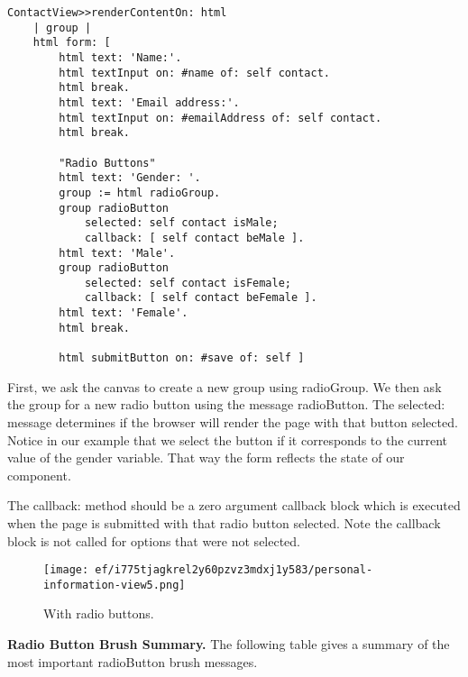 \documentclass[a4paper,10pt,twoside]{book}
\newcommand{\ct}[1]{{\small\ttfamily\textup{#1}}}
\begin{document}
\begin{lstlisting}
ContactView>>renderContentOn: html
    | group |
    html form: [
        html text: 'Name:'.
        html textInput on: #name of: self contact.
        html break.
        html text: 'Email address:'.
        html textInput on: #emailAddress of: self contact.
        html break.

        "Radio Buttons"
        html text: 'Gender: '.
        group := html radioGroup.
        group radioButton
            selected: self contact isMale;
            callback: [ self contact beMale ].
        html text: 'Male'.
        group radioButton
            selected: self contact isFemale;
            callback: [ self contact beFemale ].
        html text: 'Female'.
        html break.

        html submitButton on: #save of: self ]
\end{lstlisting}

First, we ask the canvas to create a new group using  \ct{radioGroup}. We then ask the group for a new radio button using the message  \ct{radioButton}. The  \ct{selected:} message determines if the browser will render the page with that button selected. Notice in our example that we select the button if it corresponds to the current value of the \ct{gender} variable. That way the form reflects the state of our component. 

The  \ct{callback:} method should be a zero argument callback block which is executed when the page is submitted with that radio button selected. Note the callback block is not called for options that were not selected.

\begin{figure}[h!tbp]
	\begin{center}
		\texttt{[image: ef/i775tjagkrel2y60pzvz3mdxj1y583/personal-information-view5.png]}
		\caption{With radio buttons.\label{book:fundamentals:forms:radiobuttons:personalinformationview51}}
	\end{center}
\end{figure}



\textbf{Radio Button Brush Summary.} The following table gives a summary of the most important \ct{radioButton} brush messages.

\end{document}
